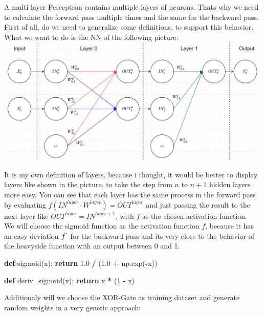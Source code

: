 \documentclass[
]{book}
\newenvironment{Shaded}{\begin{snugshade}}{\end{snugshade}}
\newcommand{\ControlFlowTok}[1]{\textcolor[rgb]{0.13,0.29,0.53}{\textbf{#1}}}
\newcommand{\DecValTok}[1]{\textcolor[rgb]{0.00,0.00,0.81}{#1}}
\newcommand{\FloatTok}[1]{\textcolor[rgb]{0.00,0.00,0.81}{#1}}
\newcommand{\KeywordTok}[1]{\textcolor[rgb]{0.13,0.29,0.53}{\textbf{#1}}}
\newcommand{\NormalTok}[1]{#1}
\newcommand{\OperatorTok}[1]{\textcolor[rgb]{0.81,0.36,0.00}{\textbf{#1}}}
\begin{document}
A multi layer Perceptron contains multiple layers of neurons. Thats why we need to calculate the forward pass multiple times and the same for the backward pass. First of all, do we need to generalize some definitions, to support this behavior. What we want to do is the NN of the following picture:\\
\includegraphics[width=1\textwidth,height=\textheight]{./img/NN_03_new.png}

It is my own definition of layers, because i thought, it would be better to display layers like shown in the picture, to take the step from \(n\) to \(n+1\) hidden layers more easy. You can see that each layer has the same process in the forward pass by evaluating \(f(IN^{layer} \cdot W^{layer}) = OUT^{layer}\) and just passing the result to the next layer like \(OUT^{layer} = IN^{layer+1}\), with \(f\) as the chosen activation function.\\
We will choose the sigmoid function as the activation function \(f\), because it has an easy deviation \(f^`\) for the backward pass and its very close to the behavior of the heavyside function with an output between 0 and 1.

\begin{Shaded}
\begin{Highlighting}[]
\KeywordTok{def}\NormalTok{ sigmoid(x):}
  \ControlFlowTok{return} \FloatTok{1.0} \OperatorTok{/}\NormalTok{ (}\FloatTok{1.0} \OperatorTok{+}\NormalTok{ np.exp(}\OperatorTok{{-}}\NormalTok{x))}

\KeywordTok{def}\NormalTok{ deriv\_sigmoid(x):}
  \ControlFlowTok{return}\NormalTok{ x }\OperatorTok{*}\NormalTok{ (}\DecValTok{1} \OperatorTok{{-}}\NormalTok{ x)}
\end{Highlighting}
\end{Shaded}

Additionaly will we choose the XOR-Gate as training dataset and generate random weights in a very generic approach:
\end{document}
